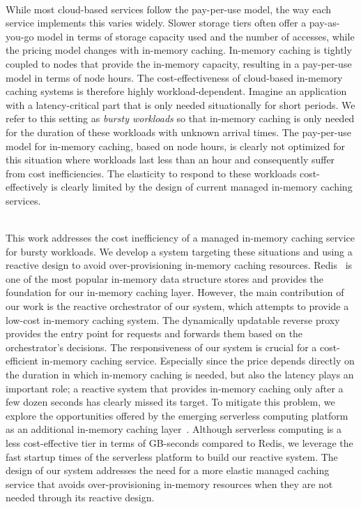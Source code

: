 ~\\
While most cloud-based services follow the pay-per-use model, the way each service implements this varies widely. Slower storage tiers often offer a pay-as-you-go model in terms of storage capacity used and the number of accesses, while the pricing model changes with in-memory caching. In-memory caching is tightly coupled to nodes that provide the in-memory capacity, resulting in a pay-per-use model in terms of node hours. The cost-effectiveness of cloud-based in-memory caching systems is therefore highly workload-dependent. Imagine an application with a latency-critical part that is only needed situationally for short periods. We refer to this setting as \emph{bursty workloads} so that in-memory caching is only needed for the duration of these workloads with unknown arrival times. The pay-per-use model for in-memory caching, based on node hours, is clearly not optimized for this situation where workloads last less than an hour and consequently suffer from cost inefficiencies. The elasticity to respond to these workloads cost-effectively is clearly limited by the design of current managed in-memory caching services.

~\\
This work addresses the cost inefficiency of a managed in-memory caching service for bursty workloads. We develop a system targeting these situations and using a reactive design to avoid over-provisioning in-memory caching resources. Redis~\cite{noauthor_redis_nodate-3} is one of the most popular in-memory data structure stores and provides the foundation for our in-memory caching layer. However, the main contribution of our work is the reactive orchestrator of our system, which attempts to provide a low-cost in-memory caching system. The dynamically updatable reverse proxy provides the entry point for requests and forwards them based on the orchestrator's decisions. The responsiveness of our system is crucial for a cost-efficient in-memory caching service. Especially since the price depends directly on the duration in which in-memory caching is needed, but also the latency plays an important role; a reactive system that provides in-memory caching only after a few dozen seconds has clearly missed its target. To mitigate this problem, we explore the opportunities offered by the emerging serverless computing platform as an additional in-memory caching layer~\cite{noauthor_serverless_nodate}. Although serverless computing is a less cost-effective tier in terms of GB-seconds compared to Redis, we leverage the fast startup times of the serverless platform to build our reactive system. The design of our system addresses the need for a more elastic managed caching service that avoids over-provisioning in-memory resources when they are not needed through its reactive design. 


